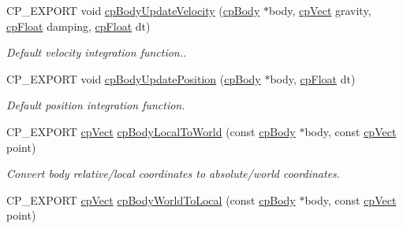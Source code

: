 \begin{DoxyCompactItemize}
\item 
\mbox{\label{group__cp_body_ga159fab7ed8170ccba8cfe66a9c97a4ac}} 
C\+P\+\_\+\+E\+X\+P\+O\+RT void \mbox{\hyperlink{group__cp_body_ga159fab7ed8170ccba8cfe66a9c97a4ac}{cp\+Body\+Update\+Velocity}} (\mbox{\hyperlink{structcp_body}{cp\+Body}} $\ast$body, \mbox{\hyperlink{structcp_vect}{cp\+Vect}} gravity, \mbox{\hyperlink{group__basic_types_gac1ed65573e035bf892505768c852d8d3}{cp\+Float}} damping, \mbox{\hyperlink{group__basic_types_gac1ed65573e035bf892505768c852d8d3}{cp\+Float}} dt)
\begin{DoxyCompactList}\small\item\em Default velocity integration function.. \end{DoxyCompactList}\item 
\mbox{\label{group__cp_body_ga20c279044f835290b0eb24dd4ff451ac}} 
C\+P\+\_\+\+E\+X\+P\+O\+RT void \mbox{\hyperlink{group__cp_body_ga20c279044f835290b0eb24dd4ff451ac}{cp\+Body\+Update\+Position}} (\mbox{\hyperlink{structcp_body}{cp\+Body}} $\ast$body, \mbox{\hyperlink{group__basic_types_gac1ed65573e035bf892505768c852d8d3}{cp\+Float}} dt)
\begin{DoxyCompactList}\small\item\em Default position integration function. \end{DoxyCompactList}\item 
\mbox{\label{group__cp_body_ga35e470ae1d4c0df38fe7145d029f8399}} 
C\+P\+\_\+\+E\+X\+P\+O\+RT \mbox{\hyperlink{structcp_vect}{cp\+Vect}} \mbox{\hyperlink{group__cp_body_ga35e470ae1d4c0df38fe7145d029f8399}{cp\+Body\+Local\+To\+World}} (const \mbox{\hyperlink{structcp_body}{cp\+Body}} $\ast$body, const \mbox{\hyperlink{structcp_vect}{cp\+Vect}} point)
\begin{DoxyCompactList}\small\item\em Convert body relative/local coordinates to absolute/world coordinates. \end{DoxyCompactList}\item 
\mbox{\label{group__cp_body_ga1a098b8788c6d910a8048300ac3f5c77}} 
C\+P\+\_\+\+E\+X\+P\+O\+RT \mbox{\hyperlink{structcp_vect}{cp\+Vect}} \mbox{\hyperlink{group__cp_body_ga1a098b8788c6d910a8048300ac3f5c77}{cp\+Body\+World\+To\+Local}} (const \mbox{\hyperlink{structcp_body}{cp\+Body}} $\ast$body, const \mbox{\hyperlink{structcp_vect}{cp\+Vect}} point)

\end{DoxyCompactItemize}
